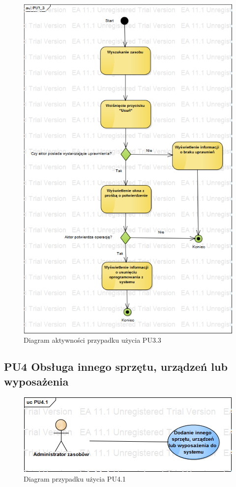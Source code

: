 \begin{figure}[h!]
	\centering
	\includegraphics[scale=0.6]{img/diagrams/activityDiagrams/PU3_3}
	\caption{Diagram aktywności przypadku użycia PU3.3 \label{fig:labelADPU3.3}}
\end{figure}

\subsection{PU4 Obsługa innego sprzętu, urządzeń lub wyposażenia} \label{pu4}

\begin{figure}[h!]
	\centering
	\includegraphics[scale=0.6]{img/diagrams/useCaseDiagrams/PU4_1.png}
	\caption{Diagram przypadku użycia PU4.1 \label{fig:labelUCPU2.1}}
\end{figure}


